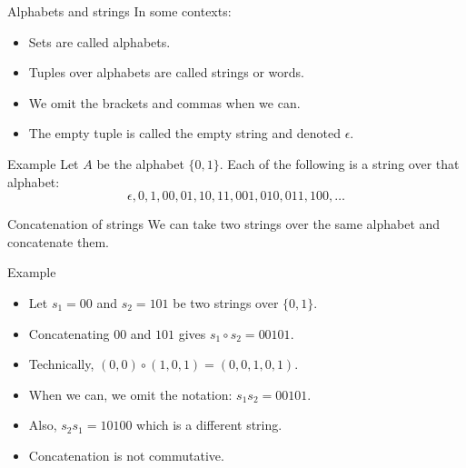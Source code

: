 \begin{frame}{Alphabets and strings}
  In some contexts:
  \begin{itemize}
    \item Sets are called alphabets.
    \item Tuples over alphabets are called strings or words.
    \item We omit the brackets and commas when we can.
    \item The empty tuple is called the empty string and denoted $\epsilon$.
  \end{itemize}
  \vspace{3mm}
  \begin{exampleblock}{Example}
    Let $A$ be the alphabet $\{0, 1\}$. Each of the following is a string over that alphabet:
      $$ \epsilon, 0, 1, 00, 01, 10, 11, 001, 010, 011, 100, \ldots $$
  \end{exampleblock}
\end{frame}

\begin{frame}{Concatenation of strings}
  We can take two strings over the same alphabet and concatenate them.
  \vspace{2mm}
  \begin{exampleblock}{Example}
    \begin{itemize}
      \setlength\itemsep{3mm}
      \item Let $s_1 = 00$ and $s_2=101$ be two strings over $\{0,1\}$.
      \item Concatenating $00$ and $101$ gives $s_1 \circ s_2 = 00101$.
      \item Technically, $(0,0) \circ (1,0,1) = (0,0,1,0,1)$.
      \item When we can, we omit the notation: $s_1s_2 = 00101$.
      \item Also, $s_2s_1 = 10100$ which is a different string.
      \item Concatenation is not commutative.
    \end{itemize}
  \end{exampleblock}
\end{frame}


